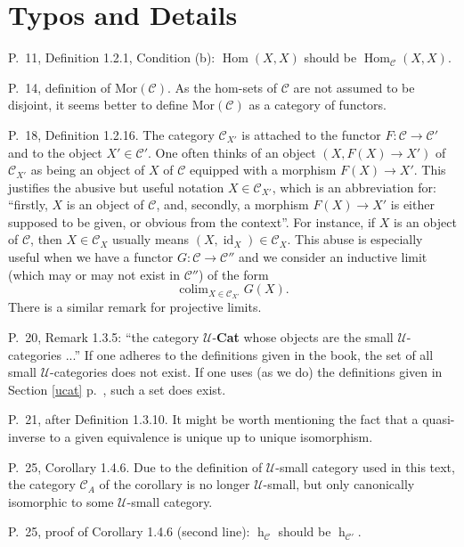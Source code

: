 \documentclass[12pt]{article}
\theoremstyle{remark}%
\newcommand{\n}{\noindent}
\newcommand{\C}{\mathcal C}
\newcommand{\U}{\mathcal U}
\DeclareMathOperator*{\coli}{colim}
\DeclareMathOperator{\hy}{h}
\DeclareMathOperator{\id}{id}
\DeclareMathOperator{\Hom}{Hom}
\begin{document}
\centerline{}
%
\section{Typos and Details} %
%
P.~11, Definition 1.2.1, Condition (b): $\Hom(X,X)$ should be $\Hom_{\C}(X,X)$. 

\n P.~14, definition of $\text{Mor}(\C)$. As the hom-sets of $\C$ are not assumed to be disjoint, it seems better to define $\text{Mor}(\C)$ as a category of functors. 


\n P.~18, Definition 1.2.16. The category $\C_{X'}$ is attached to the functor $F:\C\to\C'$ and to the object $X'\in\C'$. One often thinks of an object $(X,F(X)\to X')$ of $\C_{X'}$ as being an object of $X$ of $\C$ equipped with a morphism $F(X)\to X'$. This justifies the abusive but useful notation $X\in\C_{X'}$, which is an abbreviation for: ``firstly, $X$ is an object of $\C$, and, secondly, a morphism $F(X)\to X'$ is either supposed to be given, or obvious from the context''. For instance, if $X$ is an object of $\C$, then $X\in\C_X$ usually means $(X,\id_X)\in\C_X$. This abuse is especially useful when we have a functor $G:\C\to\C''$ and we consider an inductive limit (which may or may not exist in $\C''$) of the form 
%
\begin{equation}\label{convnot}
\coli_{X\in\C_{X'}}G(X).  
\end{equation}
% 
There is a similar remark for projective limits. 


\n P.~20, Remark 1.3.5: ``the category $\U$-\textbf{Cat} whose objects are the small $\U$-categories ...'' If one adheres to the definitions given in the book, the set of all small $\U$-categories does not exist. If one uses (as we do) the definitions given in Section \ref{ucat} p.~\pageref{ucat}, such a set does exist. 

\n P.~21, after Definition 1.3.10. It might be worth mentioning the fact that a quasi-inverse to a given equivalence is unique up to unique isomorphism. 

\n P.~25, Corollary 1.4.6. Due to the definition of $\U$-small category used in this text, the category $\C_A$ of the corollary is no longer $\U$-small, but only canonically isomorphic to some $\U$-small category.

\n P.~25, proof of Corollary 1.4.6 (second line): $\hy_{\C}$ should be $\hy_{\C'}$. 
\end{document}
